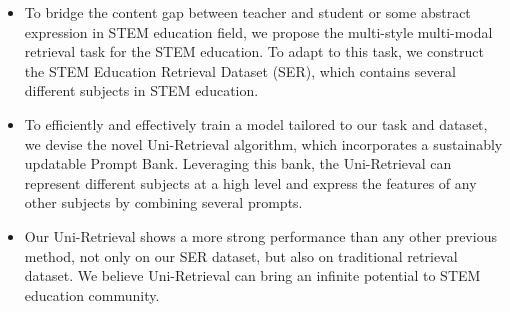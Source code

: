 \begin{itemize}
    \item To bridge the content gap between teacher and student or some abstract expression in STEM education field, we propose the multi-style multi-modal retrieval task for the STEM education. To adapt to this task, we construct the STEM Education Retrieval Dataset (SER), which contains several different subjects in STEM education.
\vspace{-0.5\intextsep}
    \item To efficiently and effectively train a model tailored to our task and dataset, we devise the novel Uni-Retrieval algorithm, which incorporates a sustainably updatable Prompt Bank. Leveraging this bank, the Uni-Retrieval can represent different subjects at a high level and express the features of any other subjects by combining several prompts. 
\vspace{-0.5\intextsep}
    \item Our Uni-Retrieval shows a more strong performance than any other previous method, not only on our SER dataset, but also on traditional retrieval dataset. We believe Uni-Retrieval can bring an infinite potential to STEM education community.%
\end{itemize}
\vspace{-0.5\intextsep}

  
